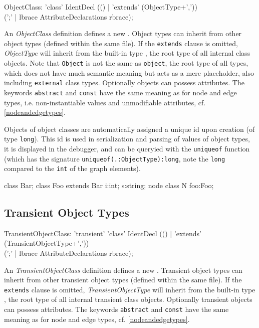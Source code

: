 \begin{rail}
  ObjectClass: 'class' IdentDecl (() | 'extends' (ObjectType+',')) \\
    (';' | lbrace AttributeDeclarations rbrace);
\end{rail}
An \emph{ObjectClass} definition defines a new .
Object types can inherit from other object types (defined within the same file).
If the \texttt{extends} clause is omitted, \emph{ObjectType} will inherit from the built-in type \texttt{}, the root type of all internal class objects.
Note that \texttt{Object} is not the same as \texttt{object}, the root type of all types, which does not have much semantic meaning but acts as a mere placeholder, also including \texttt{external} class types.
Optionally objects can possess attributes.
The keywords \texttt{abstract} and \texttt{const} have the same meaning as for node and edge types, i.e. non-instantiable values and unmodifiable attributes, cf. \ref{nodeandedgetypes}.

Objects of object classes are automatically assigned a unique id upon creation (of type \texttt{long}).
This id is used in serialization and parsing of values of object types, it is displayed in the debugger, and can be queryied with the \texttt{uniqueof} function (which has the signature \texttt{uniqueof(.:ObjectType):long}, note the \texttt{long} compared to the \texttt{int} of the graph elements).

\begin{example}
\begin{grgen}
class Bar;
class Foo extends Bar
{
  i:int;
  s:string;
}
node class N
{
  foo:Foo;
}
\end{grgen}
\end{example}


\subsection{Transient Object Types}

\begin{rail}
  TransientObjectClass: 'transient' 'class' IdentDecl (() | 'extends' (TransientObjectType+',')) \\
    (';' | lbrace AttributeDeclarations rbrace);
\end{rail}
An \emph{TransientObjectClass} definition defines a new .
Transient object types can inherit from other transient object types (defined within the same file).
If the \texttt{extends} clause is omitted, \emph{TransientObjectType} will inherit from the built-in type \texttt{}, the root type of all internal transient class objects.
Optionally transient objects can possess attributes.
The keywords \texttt{abstract} and \texttt{const} have the same meaning as for node and edge types, cf. \ref{nodeandedgetypes}.

